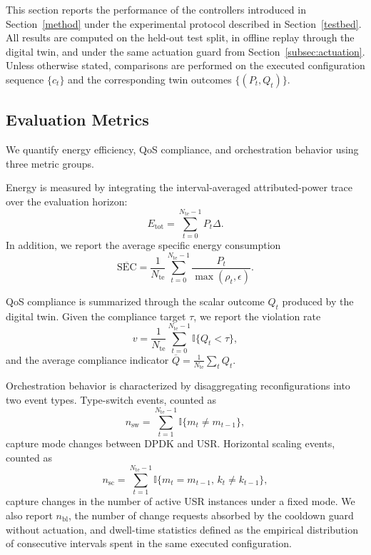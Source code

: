 \documentclass[a4paper,fleqn]{cas-sc}
\begin{document}
This section reports the performance of the controllers introduced in Section~\ref{method} under the experimental protocol described in Section~\ref{testbed}. All results are computed on the held-out test split, in offline replay through the digital twin, and under the same actuation guard from Section~\ref{subsec:actuation}. Unless otherwise stated, comparisons are performed on the executed configuration sequence $\{c_t\}$ and the corresponding twin outcomes $\{(P_t,Q_t)\}$.

\subsection{Evaluation Metrics}
\label{subsec:metrics}

We quantify energy efficiency, QoS compliance, and orchestration behavior using three metric groups.

Energy is measured by integrating the interval-averaged attributed-power trace over the evaluation horizon:
\begin{equation}
E_{\mathrm{tot}}=\sum_{t=0}^{N_{\mathrm{te}}-1} P_t \Delta.
\label{eq:total_energy}
\end{equation}
In addition, we report the average specific energy consumption
\begin{equation}
\overline{\mathrm{SEC}}=\frac{1}{N_{\mathrm{te}}}\sum_{t=0}^{N_{\mathrm{te}}-1}\frac{P_t}{\max(\rho_t,\epsilon)}.
\label{eq:avg_sec}
\end{equation}

QoS compliance is summarized through the scalar outcome $Q_t$ produced by the digital twin. Given the compliance target $\tau$, we report the violation rate
\begin{equation}
v=\frac{1}{N_{\mathrm{te}}}\sum_{t=0}^{N_{\mathrm{te}}-1}\mathbb{I}\{Q_t<\tau\},
\label{eq:violation_rate}
\end{equation}
and the average compliance indicator $\overline{Q}=\frac{1}{N_{\mathrm{te}}}\sum_t Q_t$.

Orchestration behavior is characterized by disaggregating reconfigurations into two event types. Type-switch events, counted as
\begin{equation}
n_{\mathrm{sw}}=\sum_{t=1}^{N_{\mathrm{te}}-1}\mathbb{I}\{m_t\neq m_{t-1}\},
\label{eq:nsw}
\end{equation}
capture mode changes between DPDK and USR. Horizontal scaling events, counted as
\begin{equation}
n_{\mathrm{sc}}=\sum_{t=1}^{N_{\mathrm{te}}-1}\mathbb{I}\{m_t= m_{t-1},\, k_t\neq k_{t-1}\},
\label{eq:nsc}
\end{equation}
capture changes in the number of active USR instances under a fixed mode. We also report $n_{\mathrm{bl}}$, the number of change requests absorbed by the cooldown guard without actuation, and dwell-time statistics defined as the empirical distribution of consecutive intervals spent in the same executed configuration.
\end{document}
